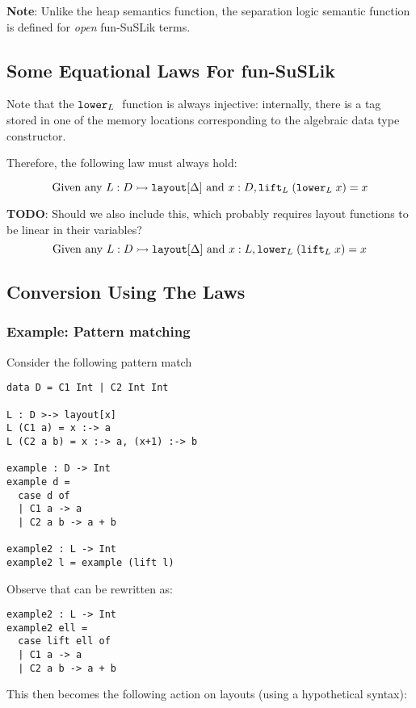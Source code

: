 \documentclass[10pt]{article}
\begin{document}
\noindent
\textbf{Note}: Unlike the heap semantics function, the separation logic semantic function is defined for \textit{open} fun-SuSLik terms.


\subsection{Some Equational Laws For fun-SuSLik}

Note that the $\texttt{lower}_{L}\;$ function is always injective: internally, there is a tag stored in one of the memory locations corresponding
to the algebraic data type constructor.

\noindent
Therefore, the following law must always hold:

\[
  \textnormal{Given any } L : D \rightarrowtail \texttt{layout}[\Delta] \textnormal{ and } x : D, \texttt{lift}_{L}\; (\texttt{lower}_{L}\; x) = x
\]

\noindent
\textbf{TODO}: Should we also include this, which probably requires layout functions to be linear in their variables?
\[
  \textnormal{Given any } L : D \rightarrowtail \texttt{layout}[\Delta] \textnormal{ and } x : L, \texttt{lower}_{L}\; (\texttt{lift}_{L}\; x) = x
\]

\subsection{Conversion Using The Laws}

\subsubsection{Example: Pattern matching}
Consider the following pattern match

\begin{lstlisting}
data D = C1 Int | C2 Int Int

L : D >-> layout[x]
L (C1 a) = x :-> a
L (C2 a b) = x :-> a, (x+1) :-> b

example : D -> Int
example d =
  case d of
  | C1 a -> a
  | C2 a b -> a + b

example2 : L -> Int
example2 l = example (lift l)
\end{lstlisting}

\noindent
Observe that  can be rewritten as:

\begin{lstlisting}
example2 : L -> Int
example2 ell =
  case lift ell of
  | C1 a -> a
  | C2 a b -> a + b
\end{lstlisting}

\noindent
This then becomes the following action on layouts (using a hypothetical syntax):
\end{document}
